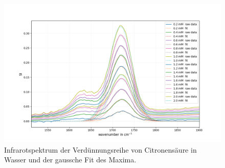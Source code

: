 \documentclass[10pt,a4paper]{article}
\begin{document}
		
		\begin{figure}[H]
			\centering
			\includegraphics[scale=0.60]{Standardcurve_citricacid_fit.png}
			\caption{Infrarotspektrum der Verdünnungsreihe von Citronensäure in Wasser und der gaussche Fit des Maxima.}
			\label{fig:IR_Standardcurve}
		\end{figure}
	
	
	
	\nocite{*}
	
	\newpage
	
	
\end{document}
